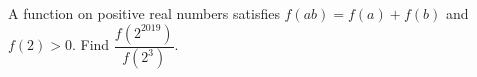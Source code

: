 A function on positive real numbers satisfies $ f(ab)=f(a)+f(b)$ and $ f(2)>0 $. Find $\dfrac{f(2^{2019})}{f(2^3)}$.
